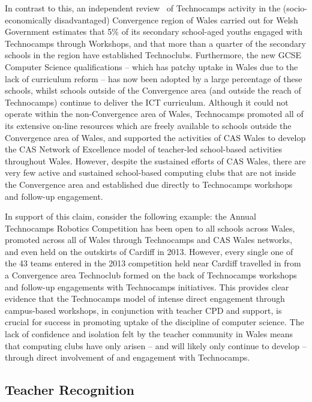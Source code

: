 \documentclass[conference]{IEEEtran}
\begin{document}
In contrast to this, an independent review~\cite{Wavehill:2015} of
Technocamps activity in the (socio-economically disadvantaged)
Convergence region of Wales carried out for Welsh Government estimates
that 5\% of its secondary school-aged youths
engaged with Technocamps through Workshops, and that more than a
quarter of the secondary schools in the region have established
Technoclubs.  Furthermore, the new GCSE Computer Science
qualifications -- which has patchy uptake in Wales due to the lack of
curriculum reform -- has now been adopted by a large percentage of
these schools, whilst schools outside of the Convergence area (and
outside the reach of Technocamps) continue to deliver the ICT
curriculum. Although it could not operate within the non-Convergence area of
Wales, Technocamps promoted all of its extensive on-line resources
which are freely available to schools outside the Convergence area of
Wales, and supported the activities of CAS Wales to develop the CAS
Network of Excellence model of teacher-led school-based activities
throughout Wales. However, despite the sustained efforts of CAS
Wales, there are very few active and sustained school-based computing
clubs that are not inside the Convergence area and established due
directly to Technocamps workshops and follow-up engagement.

In support of this claim, consider the following example: the Annual
Technocamps Robotics Competition has been open to all schools across
Wales, promoted across all of Wales through Technocamps and CAS Wales
networks, and even held on the outskirts of Cardiff in 2013.  However,
every single one of the 43 teams entered in the 2013 competition held
near Cardiff travelled in from a Convergence area Technoclub formed on
the back of Technocamps workshops and follow-up engagements with
Technocamps initiatives. This provides clear evidence that the
Technocamps model of intense direct engagement through campus-based
workshops, in conjunction with teacher CPD and support, is crucial for
success in promoting uptake of the discipline of computer science. The
lack of confidence and isolation felt by the teacher community in
Wales means that computing clubs have only arisen -- and will likely
only continue to develop -- through direct involvement of and
engagement with Technocamps.

\subsection{Teacher Recognition}
\label{teacherrecog}
\end{document}
